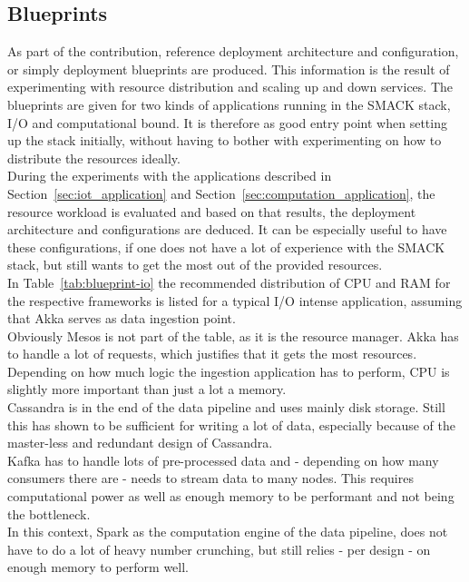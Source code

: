 \subsection{Blueprints}
As part of the contribution, reference deployment architecture and configuration, or simply deployment blueprints are produced.
This information is the result of experimenting with resource distribution and scaling up and down services.
The blueprints are given for two kinds of applications running in the SMACK stack, I/O and computational bound.
It is therefore as good entry point when setting up the stack initially, without having to bother with experimenting on how to distribute the resources ideally.\\
During the experiments with the applications described in Section~\ref{sec:iot_application} and Section~\ref{sec:computation_application}, the resource workload is evaluated and based on that results, the deployment architecture and configurations are deduced.
It can be especially useful to have these configurations, if one does not have a lot of experience with the SMACK stack, but still wants to get the most out of the provided resources.\\

In Table~\ref{tab:blueprint-io} the recommended distribution of CPU and RAM for the respective frameworks is listed for a typical I/O intense application, assuming that Akka serves as data ingestion point.\\
Obviously Mesos is not part of the table, as it is the resource manager.
Akka has to handle a lot of requests, which justifies that it gets the most resources.
Depending on how much logic the ingestion application has to perform, CPU is slightly more important than just a lot a memory.\\
Cassandra is in the end of the data pipeline and uses mainly disk storage.
Still this has shown to be sufficient for writing a lot of data, especially because of the master-less and redundant design of Cassandra.\\
Kafka has to handle lots of pre-processed data and - depending on how many consumers there are - needs to stream data to many nodes.
This requires computational power as well as enough memory to be performant and not being the bottleneck.\\
In this context, Spark as the computation engine of the data pipeline, does not have to do a lot of heavy number crunching, but still relies - per design - on enough memory to perform well.\\



